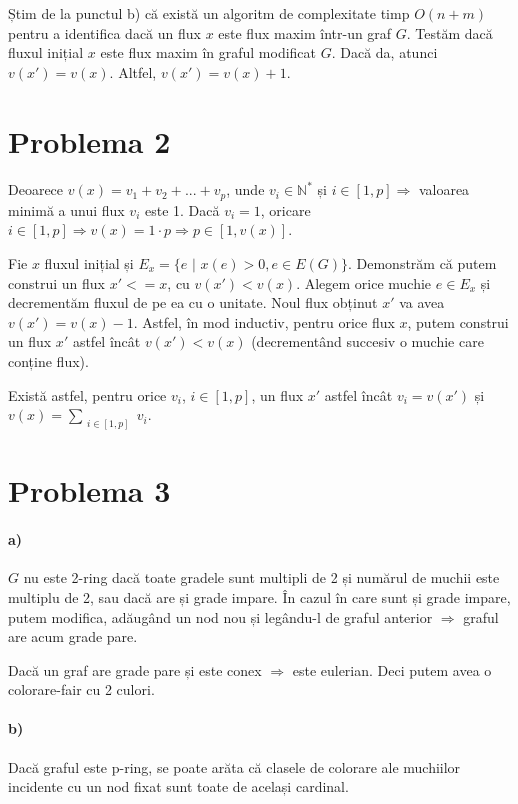 \documentclass[paper=a4, fontsize=12pt]{scrartcl}
\begin{document}
Știm de la punctul b) că există un algoritm de complexitate timp $O(n+m)$ pentru a identifica dacă un flux $x$ este flux maxim într-un
graf $G$. Testăm dacă fluxul inițial $x$ este flux maxim în graful modificat $G$. Dacă da, atunci $v(x') = v(x)$. Altfel, $v(x') = v(x)+1$. 

\section*{Problema 2}
\paragraph{}
Deoarece $v(x) = v_1+v_2+...+v_p$, unde $v_i \in \mathbb{N}^*$ și $i \in [1,p] \Rightarrow$ valoarea minimă a unui flux $v_i$ este 1. Dacă
$v_i = 1$, oricare $i \in [1,p] \Rightarrow v(x) = 1 \cdot p \Rightarrow p \in [1,v(x)]$.

Fie $x$ fluxul inițial și $E_x = \{e$ $|$ $x(e)>0, e \in E(G)\}$. Demonstrăm că putem construi un flux $x'<=x$, cu $v(x')<v(x)$. Alegem orice muchie
$e \in E_x$ și decrementăm fluxul de pe ea cu o unitate. Noul flux obținut $x'$ va avea $v(x') = v(x)-1$. Astfel, în mod inductiv, pentru orice flux $x$, 
putem construi un flux $x'$ astfel încât $v(x') < v(x)$ (decrementând succesiv o muchie care conține flux).

Există astfel, pentru orice $v_i$, $i \in [1,p]$, un flux $x'$ astfel încât $v_i = v(x')$ și $v(x) = \displaystyle\sum_{\substack{i \in [1,p]}} v_i$. 

\section*{Problema 3}
\paragraph{a)}
$G$ nu este 2-ring dacă toate gradele sunt multipli de 2 și numărul de muchii este multiplu de 2, sau dacă are și grade impare. În cazul în care sunt și grade impare,
putem modifica, adăugând un nod nou și legându-l de graful anterior $\Rightarrow$ graful are acum grade pare.

Dacă un graf are grade pare și este conex $\Rightarrow$ este eulerian. Deci putem avea o colorare-fair cu 2 culori.
\paragraph{b)}
Dacă graful este p-ring, se poate arăta că clasele de colorare ale muchiilor incidente cu un nod fixat sunt toate de același cardinal.
\end{document}
